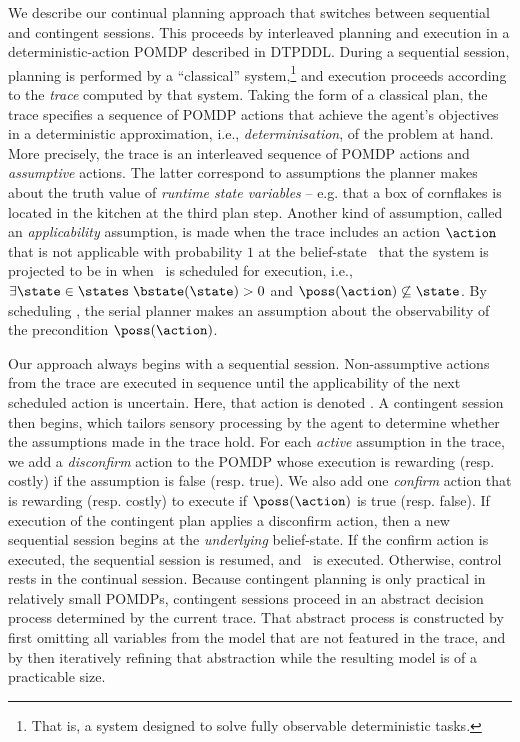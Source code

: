 

We describe our continual planning approach that switches between
sequential and contingent sessions. This proceeds by interleaved
planning and execution in a deterministic-action POMDP described in
DTPDDL. During a sequential session, planning is performed by a
``classical'' system,\footnote{That is, a system designed to solve
fully observable deterministic tasks.}  and execution proceeds
according to the {\em trace} computed by that system. Taking the form
of a classical plan, the trace specifies a sequence of POMDP
actions that achieve the agent's objectives in a deterministic
approximation, i.e., {\em determinisation}, of the problem at
hand. More precisely, the trace is an interleaved sequence of POMDP
actions and {\em assumptive} actions. The latter correspond to
assumptions the planner makes about the truth value of {\em runtime
state variables} -- e.g. that a box of cornflakes is located in the
kitchen at the third plan step. Another kind of assumption, called an
{\em applicability} assumption, is made when the trace includes an
action $\action$ that is not applicable with probability $1$ at the
belief-state
\bstate\ that the system is projected to be in when \action\ is
scheduled for execution, i.e., $\exists\state\in\states\;
\bstate(\state) > 0$ and $\poss(\action)\not\subseteq\state$. By
scheduling
\action,  the serial planner makes an assumption about the
observability of the precondition $\poss(\action)$.

Our approach always begins with a sequential session. Non-assumptive
actions from the trace are executed in sequence until the
applicability of the next scheduled action is uncertain. Here, that
action is denoted \switchAction.  A contingent session then begins,
which tailors sensory processing by the agent to determine whether the
assumptions made in the trace hold. For each {\em active} assumption
in the trace, we add a {\em disconfirm} action to the POMDP whose
execution is rewarding (resp. costly) if the assumption is false
(resp. true). We also add one {\em confirm} action that is rewarding
(resp. costly) to execute if $\poss(\action)$ is true
(resp. false). If execution of the contingent plan applies a
disconfirm action, then a new sequential session begins at the {\em
underlying} belief-state. If the confirm action is executed, the
sequential session is resumed, and
\switchAction\ is executed. Otherwise, control rests in the continual
session.
Because contingent planning is only practical in relatively small
POMDPs, contingent sessions proceed in an abstract decision process
determined by the current trace. That abstract process is constructed
by first omitting all variables from the model that are not featured
in the trace, and by then iteratively refining that abstraction while
the resulting model is of a practicable size.

